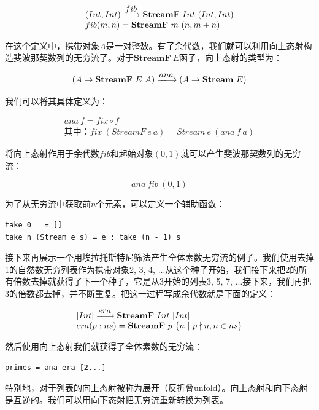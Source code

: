 \documentclass{article}
\begin{document}
\[
\begin{array}{l}
(Int, Int) \arrowto{fib} \mathbf{StreamF}\ Int\ (Int, Int) \\
fib (m, n) = \mathbf{StreamF}\ m\ (n, m + n)
\end{array}
\]

在这个定义中，携带对象$A$是一对整数。有了余代数，我们就可以利用向上态射构造斐波那契数列的无穷流了。对于$\mathbf{StreamF}\ E$函子，向上态射的类型为：

\[
(A \to \mathbf{StreamF}\ E\ A) \arrowto{ana} (A \to \mathbf{Stream}\ E)
\]

我们可以将其具体定义为：

\[
\begin{array}{l}
ana\ f = fix \circ f \\
\text{其中：} fix\ (StreamF\ e\ a) = Stream\ e\ (ana\ f\ a)
\end{array}
\]

将向上态射作用于余代数$fib$和起始对象$(0, 1)$就可以产生斐波那契数列的无穷流：

\[
ana\ fib\ (0, 1)
\]

为了从无穷流中获取前$n$个元素，可以定义一个辅助函数：

\begin{lstlisting}
take 0 _ = []
take n (Stream e s) = e : take (n - 1) s
\end{lstlisting}

接下来再展示一个用埃拉托斯特尼筛法产生全体素数无穷流的例子。我们使用去掉1的自然数无穷列表作为携带对象2, 3, 4, ...从这个种子开始，我们接下来把2的所有倍数去掉就获得了下一个种子，它是从3开始的列表3, 5, 7, ...接下来，我们再把3的倍数都去掉，并不断重复。把这一过程写成余代数就是下面的定义：

\[
\begin{array}{l}
[Int] \arrowto{era} \mathbf{StreamF}\ Int\ [Int] \\
era (p:ns) = \mathbf{StreamF}\ p\ \{ n\ |\ p \nmid n, n \in ns\} \\
\end{array}
\]

然后使用向上态射我们就获得了全体素数的无穷流：

\begin{lstlisting}
primes = ana era [2...]
\end{lstlisting}

特别地，对于列表的向上态射被称为展开（反折叠unfold）。向上态射和向下态射是互逆的。我们可以用向下态射把无穷流重新转换为列表。

\begin{Exercise}
\end{Exercise}
\end{document}
